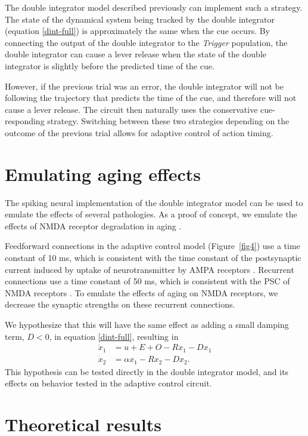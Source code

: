 \documentclass[11pt]{article}
\begin{document}
The double integrator model described
previously can implement such a strategy.
The state of the dynamical system being tracked by
the double integrator (equation \eqref{dint-full})
is approximately the same when the cue occurs.
By connecting the output of the double integrator
to the \textit{Trigger} population,
the double integrator can cause a lever release
when the state of the double integrator
is slightly before the predicted
time of the cue.

However, if the previous trial was an error,
the double integrator will not
be following the trajectory
that predicts the time of the cue,
and therefore will not cause a lever release.
The circuit then naturally
uses the conservative
cue-responding strategy.
Switching between these two strategies
depending on the outcome
of the previous trial
allows for adaptive control of action timing.

\section{Emulating aging effects}

The spiking neural implementation
of the double integrator model can be used
to emulate the effects of several pathologies.
As a proof of concept,
we emulate the effects of NMDA receptor degradation
in aging \citep{Magnusson1998}.

Feedforward connections
in the adaptive control model (Figure~\ref{fig4})
use a time constant of 10 ms,
which is consistent with the time constant
of the postsynaptic current
induced by uptake of neurotransmitter
by AMPA receptors \citep{Spruston1995}.
Recurrent connections use a time constant of 50 ms,
which is consistent with the PSC
of NMDA receptors \citep{Sah1990}.
To emulate the effects of aging on NMDA receptors,
we decrease the synaptic strengths
on these recurrent connections.

We hypothesize that this will have the same effect
as adding a small damping term, $D < 0$,
in equation \eqref{dint-full}, resulting in
\begin{align} \label{dint-damped}
  \dot{x}_1 &= u + E + O - R x_1 - D x_1 \nonumber \\
  \dot{x}_2 &= \alpha x_1 - R x_2 - D x_2.
\end{align}
This hypothesis can be tested directly
in the double integrator model,
and its effects on behavior tested
in the adaptive control circuit.

\section{Theoretical results}
\end{document}
